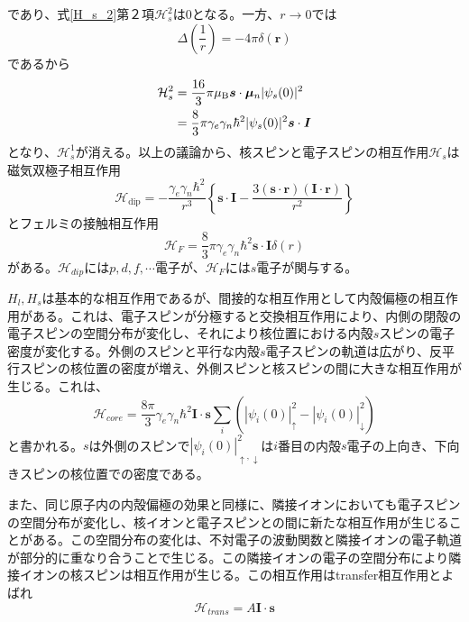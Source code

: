\documentclass[11pt,a4j]{jreport}
\begin{document}
であり、式\ref{H_s_2}第２項$\mathcal{H}_s^2$は0となる。一方、$r\to0$では
\begin{equation}
  \Delta \left(\frac{1}{r}\right)=-4\pi\delta(\bm{r})
\end{equation}
であるから
\begin{align}
  \mathcal{H}_s^2&=\frac{16}{3}\pi \mu_{\text B} \bm{s}\cdot\bm{\mu}_n|\psi_s(0)|^2\\
  &=\frac{8}{3}\pi \gamma_e\gamma_n\hbar^2|\psi_s(0)|^2\bm{s}\cdot\bm{I}
\end{align}
となり、$\mathcal{H}_s^1$が消える。以上の議論から、核スピンと電子スピンの相互作用$\mathcal{H}_s$は磁気双極子相互作用
\begin{equation}
  \mathcal{H}_{\text{dip}} = -\frac{\gamma_e \gamma_n \hbar^2}{r^3} \left\{ \bm{s} \cdot \bm{I} - \frac{3 (\bm{s} \cdot \bm{r}) (\bm{I} \cdot \bm{r})}{r^2} \right\}
  \label{H_dip}
\end{equation}
とフェルミの接触相互作用
\begin{equation}
  \mathcal{H}_F=\frac{8}{3}\pi\gamma_e\gamma_n\hbar^2\bm{s}\cdot \bm{I}\delta(r)
  \label{H_F}
\end{equation}
がある。$\mathcal{H}_{dip}$には$p,d,f,\cdots$電子が、$\mathcal{H}_F$には$s$電子が関与する。\par
$H_l,H_s$は基本的な相互作用であるが、間接的な相互作用として内殻偏極の相互作用がある。これは、電子スピンが分極すると交換相互作用により、内側の閉殻の電子スピンの空間分布が変化し、それにより核位置における内殻$s$スピンの電子密度が変化する。外側のスピンと平行な内殻$s$電子スピンの軌道は広がり、反平行スピンの核位置の密度が増え、外側スピンと核スピンの間に大きな相互作用が生じる。これは、
\begin{equation}
\mathcal{H}_{core}=\frac{8\pi}{3}\gamma_e\gamma_n\hbar^2\bm{I}\cdot\bm{s}\sum_{i}{(|\psi_i(0)|_\uparrow^2-|\psi_i(0)|_\downarrow^2 )}
\label{H_core}
\end{equation}
と書かれる。$s$は外側のスピンで$|\psi_i(0)|_{\uparrow,\downarrow }^2$は$i$番目の内殻$s$電子の上向き、下向きスピンの核位置での密度である。\par
また、同じ原子内の内殻偏極の効果と同様に、隣接イオンにおいても電子スピンの空間分布が変化し、核イオンと電子スピンとの間に新たな相互作用が生じることがある。この空間分布の変化は、不対電子の波動関数と隣接イオンの電子軌道が部分的に重なり合うことで生じる。この隣接イオンの電子の空間分布により隣接イオンの核スピンは相互作用が生じる。この相互作用はtransfer相互作用とよばれ
\begin{equation}
\mathcal{H}_{trans} = A\bm{I}\cdot\bm{s}
\end{equation}
\end{document}
